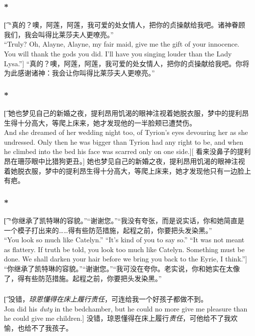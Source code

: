 \documentclass[12pt,a4paper]{article}
\begin{document}
\subsubsection{\color{red}*}\t[
	“真的？噢，阿莲，阿莲，我可爱的处女情人，把你的贞操献给我吧。诸神眷顾我们，我会叫得比莱莎夫人更嘹亮。”\\
	“Truly? Oh, Alayne, Alayne, my fair maid, give me the gift of your innocence. You will thank the gods you did. I'll have you singing louder than the Lady Lysa.”]
	“真的？噢，阿莲，阿莲，我可爱的处女情人，把你的贞操献给我吧。你将为此感谢诸神：我会让你叫得比莱莎夫人更嘹亮。”
	
\subsubsection{\color{red}*}\t[
	她也梦见自己的新婚之夜，提利昂用饥渴的眼神注视着她脱衣服，梦中的提利昂生得十分高大，等爬上床来，她才发现他的一半脸颊已遭焚伤。\\
	And she dreamed of her wedding night too, of Tyrion's eyes devouring her as she undressed. Only then he was bigger than Tyrion had any right to be, and when he climbed into the bed his face was scarred only on one side.][
	看来没鼻子的提利昂在珊莎眼中比猎狗更丑。]
	她也梦见自己的新婚之夜，提利昂用饥渴的眼神注视着她脱衣服，梦中的提利昂生得十分高大，等爬上床来，她才发现他只有一边脸上有疤。
	
\subsubsection{\color{red}*}\t[
	 “你继承了凯特琳的容貌。”“谢谢您。”“我没有夸张，而是说实话，你和她简直是一个模子打出来的……得有些防范措施，起程之前，你要把头发染黑。”\\
	 “You look so much like Catelyn.” “It's kind of you to say so.” “It was not meant as flattery. If truth be told, you look too much like Catelyn. Something must be done. We shall darken your hair before we bring you back to the Eyrie, I think.”]
	 “你继承了凯特琳的容貌。”“谢谢您。”“我可没在夸你。老实说，你和她实在太像了，得有些防范措施。起程之前，你要把头发染黑。”
	 
\subsubsection{}\t[
	没错，\emph{琼恩懂得在床上履行责任}，可连给我一个好孩子都做不到。\\
	Jon did his \emph{duty} in the bedchamber, but he could no more give me pleasure than he could give me children.]
	没错，琼恩懂得在床上履行\emph{责任}，可他给不了我欢愉，也给不了我孩子。
\end{document}
